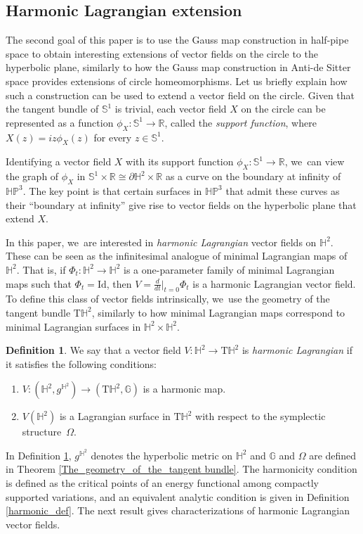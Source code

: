 \documentclass[11pt]{article}
\theoremstyle{plain}
\theoremstyle{definition}
\newtheorem{defi}[cor]{Definition}
\newcommand{\HP}{\mathbb{HP}^3}
\begin{document}
\subsection{Harmonic Lagrangian extension}

The second goal of this paper is to use the Gauss map construction in half-pipe space to obtain interesting extensions of vector fields on the circle to the hyperbolic plane, similarly to how the Gauss map construction in Anti-de Sitter space provides extensions of circle homeomorphisms. Let us briefly explain how such a construction can be used to extend a vector field on the circle. Given that the tangent bundle of \(\mathbb{S}^1\) is trivial, each vector field \(X\) on the circle can be represented as a function \(\phi_X: \mathbb{S}^1 \to \mathbb{R}\), called the \emph{support function}, where \(X(z) = iz\phi_X(z)\) for every \(z \in \mathbb{S}^1\).

Identifying a vector field \(X\) with its support function \(\phi_X: \mathbb{S}^1 \to \mathbb{R}\), we~can view the graph of \(\phi_X\) in \(\mathbb{S}^1 \times \mathbb{R} \cong \partial \mathbb{H}^2 \times \mathbb{R}\) as a curve on the boundary at infinity of \(\HP\). The key point is that certain surfaces in \(\HP\) that admit these curves as their ``boundary at infinity'' give rise to vector fields on the hyperbolic plane that extend \(X\).

In this paper, we~are interested in \emph{harmonic Lagrangian} vector fields on \(\mathbb{H}^2\). These can be seen as the infinitesimal analogue of minimal Lagrangian maps of \(\mathbb{H}^2\). That is, if \(\Phi_t: \mathbb{H}^2 \to \mathbb{H}^2\) is a one-parameter family of minimal Lagrangian maps such that \(\Phi_t = \mathrm{Id}\), then \(V = \frac{d}{dt}\big\lvert_{t=0} \Phi_t\) is a harmonic Lagrangian vector field. To define this class of vector fields intrinsically, we~use the geometry of the tangent bundle \(\mathrm{T}\mathbb{H}^2\), similarly to how minimal Lagrangian maps correspond to minimal Lagrangian surfaces in \(\mathbb{H}^2 \times \mathbb{H}^2\).

\begin{defi}\label{intro_def1}
We say that a vector field \(V: \mathbb{H}^2 \to \mathrm{T}\mathbb{H}^2\) is \emph{harmonic Lagrangian} if it satisfies the following conditions:
\begin{enumerate}
\item \(V: (\mathbb{H}^2, g^{\mathbb{H}^2}) \to (\mathrm{T}\mathbb{H}^2, \mathbb{G})\) is a harmonic map.
\item \(V(\mathbb{H}^2)\) is a Lagrangian surface in \(\mathrm{T}\mathbb{H}^2\) with respect to the symplectic structure~\(\Omega\).
\end{enumerate}
\end{defi}
In Definition \ref{intro_def1}, \(g^{\mathbb{H}^2}\) denotes the hyperbolic metric on \(\mathbb{H}^2\) and \(\mathbb{G}\) and \(\Omega\) are defined in Theorem \ref{The_geometry_of_the_tangent bundle}. The harmonicity condition is defined as the critical points of an energy functional among compactly supported variations, and an equivalent analytic condition is given in Definition \ref{harmonic_def}. The next result gives characterizations of harmonic Lagrangian vector fields.
\end{document}
